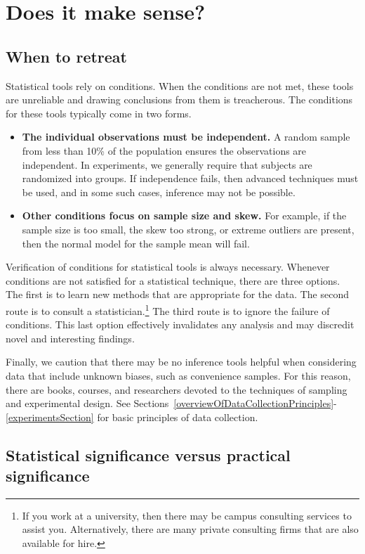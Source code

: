 \section{Does it make sense?}
\subsection{When to retreat}
\label{whenToRetreat}

Statistical tools rely on conditions. When the conditions are not met, these tools are unreliable and drawing conclusions from them is treacherous. The conditions for these tools typically come in two forms.
\begin{itemize}
\setlength{\itemsep}{0mm}
\item \textbf{The individual observations must be independent.} A random sample from less than 10\% of the population ensures the observations are independent. In experiments, we generally require that subjects are randomized into groups. If independence fails, then advanced techniques must be used, and in some such cases, inference may not be possible.
\item \textbf{Other conditions focus on sample size and skew.} For example, if the sample size is too small, the skew too strong, or extreme outliers are present, then the normal model for the sample mean will fail.
\end{itemize}
Verification of conditions for statistical tools is always necessary. Whenever conditions are not satisfied for a statistical technique, there are three options. The first is to learn new methods that are appropriate for the data. The second route is to consult a statistician.\footnote{If you work at a university, then there may be campus consulting services to assist you. Alternatively, there are many private consulting firms that are also available for hire.} The third route is to ignore the failure of conditions. This last option effectively invalidates any analysis and may discredit novel and interesting findings.

Finally, we caution that there may be no inference tools helpful when considering data that include unknown biases, such as convenience samples. For this reason, there are books, courses, and researchers devoted to the techniques of sampling and experimental design. See Sections~\ref{overviewOfDataCollectionPrinciples}-\ref{experimentsSection} for basic principles of data collection.

\subsection{Statistical significance versus practical significance}

